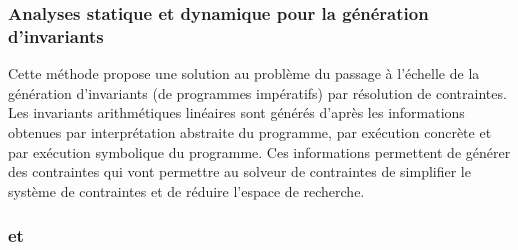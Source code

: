 

\subsubsection*{Analyses statique et dynamique pour la génération d'invariants}


Cette méthode \cite{Gupta/TACAS09} propose une solution au problème du
passage à l'échelle de la génération d'invariants (de programmes impératifs) par
résolution de contraintes. Les invariants arithmétiques linéaires sont générés
d'après les informations obtenues par interprétation abstraite du programme, par
exécution concrète et par exécution symbolique du programme. Ces informations
permettent de générer des contraintes qui vont permettre au solveur de
contraintes de simplifier le système de contraintes et de réduire l'espace de
recherche.


\subsubsection*{\dsdcrasher et \checkncrash}


